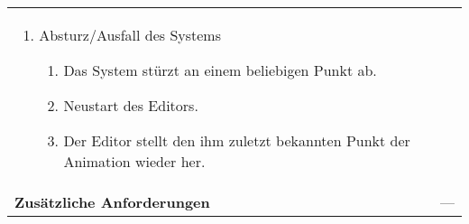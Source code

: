 \begin{longtabu}{p{0.5\textwidth}p{0.5\textwidth}}
\begin{enumerate}[label= (\alph*)]
{            }
            \item{Absturz/Ausfall des Systems
                \begin{enumerate}[label= (\roman*)]
                        \item{Das System stürzt an einem beliebigen Punkt
                                ab.}
                        \item{Neustart des Editors.}
                        \item{Der Editor stellt den ihm zuletzt bekannten
                                Punkt der Animation wieder her.}
                \end{enumerate}
            }
        \end{enumerate} \\
    \cmidrule(r){1-1}\cmidrule(lr){2-2}
        \textbf{Zusätzliche Anforderungen} &
        ---\\
    \bottomrule
\end{longtabu}
